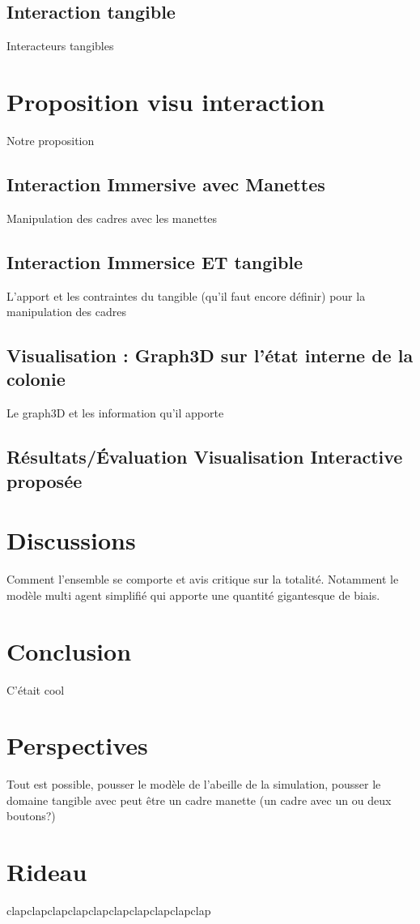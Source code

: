 \documentclass[10pt,a4paper]{article}
\begin{document}
	\subsection{Interaction tangible}
		Interacteurs tangibles
\section{Proposition visu interaction}
	Notre proposition
	\subsection{Interaction Immersive avec Manettes}
		Manipulation des cadres avec les manettes
	\subsection{Interaction Immersice ET tangible}
		L'apport et les contraintes du tangible (qu'il faut encore définir) pour la manipulation des cadres
	\subsection{Visualisation : Graph3D sur l'état interne de la colonie}
		Le graph3D et les information qu'il apporte
	\subsection{Résultats/Évaluation Visualisation Interactive proposée}
\section{Discussions}
	Comment l'ensemble se comporte et avis critique sur la totalité. Notamment le modèle multi agent simplifié qui apporte une quantité gigantesque de biais.
\section*{Conclusion}
	C'était cool
\section*{Perspectives}
	Tout est possible, pousser le modèle de l'abeille de la simulation, pousser le domaine tangible avec peut être un cadre manette (un cadre avec un ou deux boutons?)
\section*{Rideau}
	clapclapclapclapclapclapclapclapclapclap
\end{document}

